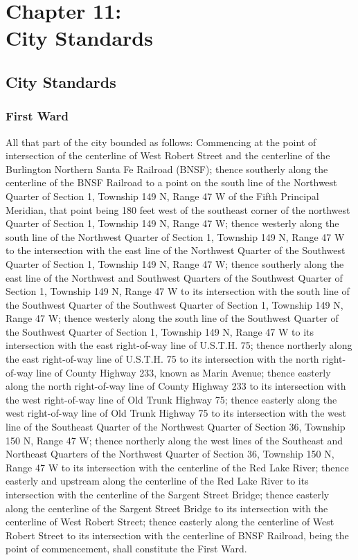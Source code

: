 \chapter*{Chapter 11: \\
	City Standards}
    \minitoc
    \pagebreak
    
\section{City Standards}
\subsection{First Ward}
All that part of the city bounded as follows:  Commencing at the point of intersection of the centerline of West Robert Street and the centerline of the Burlington Northern Santa Fe Railroad (BNSF); thence southerly along the centerline of the BNSF Railroad to a point on the south line of the Northwest Quarter of Section 1, Township 149 N, Range 47 W of the Fifth Principal Meridian, that point being 180 feet west of the southeast corner of the northwest Quarter of Section 1, Township 149 N, Range 47 W; thence westerly along the south line of the Northwest Quarter of Section 1, Township 149 N, Range 47 W to the intersection with the east line of the Northwest Quarter of the Southwest Quarter of Section 1, Township 149 N, Range 47 W; thence southerly along the east line of the Northwest and Southwest Quarters of the Southwest Quarter of Section 1, Township 149 N, Range 47 W to its intersection with the south line of the Southwest Quarter of the Southwest Quarter of Section 1, Township 149 N, Range 47 W; thence westerly along the south line of the Southwest Quarter of the Southwest Quarter of Section 1, Township 149 N, Range 47 W to its intersection with the east right-of-way line of U.S.T.H. 75; thence northerly along the east right-of-way line of U.S.T.H. 75 to its intersection with the north right-of-way line of County Highway 233, known as Marin Avenue; thence easterly along the north right-of-way line of County Highway 233 to its intersection with the west right-of-way line of Old Trunk Highway 75; thence easterly along the west right-of-way line of Old Trunk Highway 75 to its intersection with the west line of the Southeast Quarter of the Northwest Quarter of Section 36, Township 150 N, Range 47 W; thence northerly along the west lines of the Southeast and Northeast Quarters of the Northwest Quarter of Section 36, Township 150 N, Range 47 W to its intersection with the centerline of the Red Lake River; thence easterly and upstream along the centerline of the Red Lake River to its intersection with the centerline of the Sargent Street Bridge; thence easterly along the centerline of the Sargent Street Bridge to its intersection with the centerline of West Robert Street; thence easterly along the centerline of West Robert Street to its intersection with the centerline of BNSF Railroad, being the point of commencement, shall constitute the First Ward.

